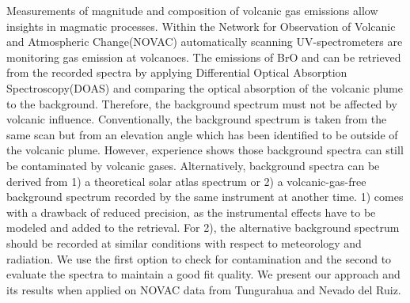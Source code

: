 
Measurements of magnitude and composition of volcanic gas emissions allow insights in magmatic processes. Within the Network for Observation of Volcanic and Atmospheric Change(NOVAC) automatically scanning UV-spectrometers are monitoring gas emission at volcanoes. The emissions of BrO and  can be retrieved from the recorded spectra by applying Differential Optical Absorption Spectroscopy(DOAS) and comparing the optical absorption of the volcanic plume to the background. Therefore, the background spectrum must not be affected by volcanic influence. Conventionally, the background spectrum is taken from the same scan but from an elevation angle which has been identified to be outside of the volcanic plume. However, experience shows those background spectra can still be contaminated by volcanic gases.  Alternatively, background spectra can be derived from 1) a theoretical solar atlas spectrum or 2) a volcanic-gas-free background spectrum recorded by the same instrument at another time. 1) comes with a drawback of reduced precision, as the instrumental effects have to be modeled and added to the retrieval. For 2), the alternative background spectrum should be recorded at similar conditions with respect to meteorology and radiation. We use the first option to check for contamination and the second to evaluate the spectra to maintain a good fit quality. We present our approach and its results when applied on NOVAC data from Tungurahua and Nevado del Ruiz.
